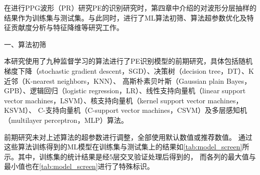 在进行PPG波形（PR）研究PE的识别研究时，第四章中介绍的对波形分层抽样的结果作为训练集与测试集。与此同时，进行了ML算法初筛、算法超参数优化及特征贡献度分析与特征降维等研究工作。

一、算法初筛

本研究使用了九种监督学习的算法进行了PE识别模型的前期研究，具体包括随机梯度下降（stochastic gradient descent，SGD）、决策树（decision tree，DT）、K近邻（K-nearest neighbors，KNN）、
高斯朴素贝叶斯（Gaussian plain Bayes，GPB）、逻辑回归（logistic regression，LR）、线性支持向量机（linear support vector machines，LSVM）、核支持向量机（kernel support vector machines，KSVM）、
C-支持向量机（C-support vector machines，CSVM）及多层感知机（multilayer perceptron，MLP）算法。

前期研究未对上述算法的超参数进行调整，全部使用默认数值或推荐数值\cite{scikit-learn}。
通过这些算法训练得到的ML模型在训练集与测试集上的结果如\autoref{tab:model_screen}所示。其中，训练集的统计结果是经5层交叉验证处理后得到的，
而各列的最大值与最小值也在\autoref{tab:model_screen}进行了特殊标识。
